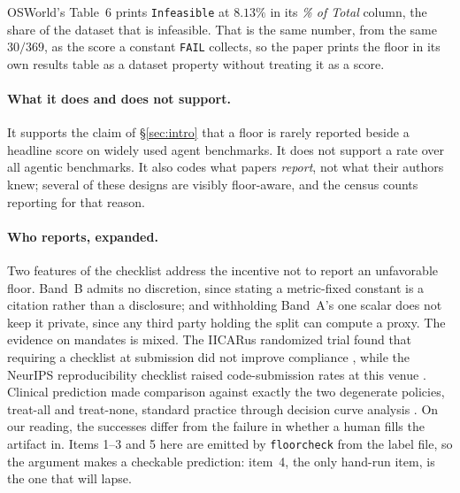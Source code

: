 \documentclass{article}
\theoremstyle{plain}
\theoremstyle{definition}
\newcommand{\floorcheck}{\texttt{floorcheck}}
\begin{document}
OSWorld's Table~6 prints \texttt{Infeasible} at $8.13\%$ in its \emph{\% of Total} column, the share of the dataset that is infeasible. That is the same number, from the same $30/369$, as the score a constant \texttt{FAIL} collects, so the paper prints the floor in its own results table as a dataset property without treating it as a score.

\paragraph{What it does and does not support.} It supports the claim of \S\ref{sec:intro} that a floor is rarely reported beside a headline score on widely used agent benchmarks. It does not support a rate over all agentic benchmarks. It also codes what papers \emph{report}, not what their authors knew; several of these designs are visibly floor-aware, and the census counts reporting for that reason.

\paragraph{Who reports, expanded.} Two features of the checklist address the incentive not to report an unfavorable floor. Band~B admits no discretion, since stating a metric-fixed constant is a citation rather than a disclosure; and withholding Band~A's one scalar does not keep it private, since any third party holding the split can compute a proxy. The evidence on mandates is mixed. The IICARus randomized trial found that requiring a checklist at submission did not improve compliance \citep{hair2019iicarus}, while the NeurIPS reproducibility checklist raised code-submission rates at this venue \citep{pineau2021reproducibility}. Clinical prediction made comparison against exactly the two degenerate policies, treat-all and treat-none, standard practice through decision curve analysis \citep{vickers2006decision}. On our reading, the successes differ from the failure in whether a human fills the artifact in. Items 1--3 and 5 here are emitted by \floorcheck{} from the label file, so the argument makes a checkable prediction: item~4, the only hand-run item, is the one that will lapse.
\end{document}

